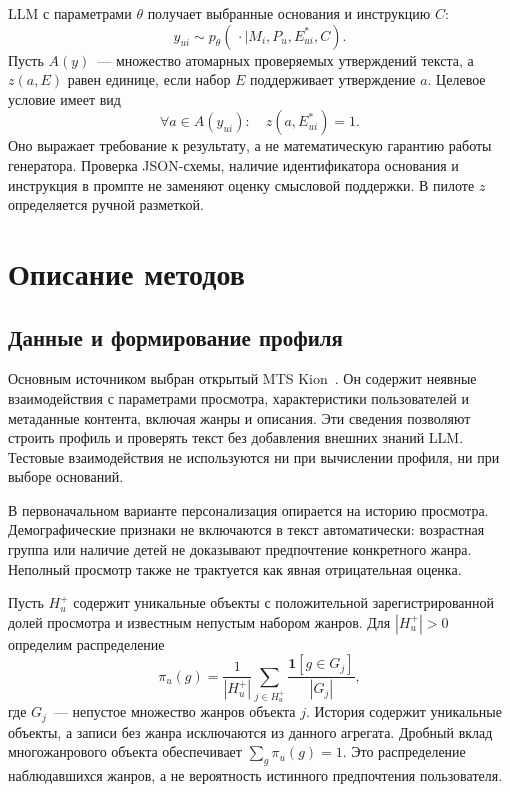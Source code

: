 \documentclass{misisarticle}
\begin{document}
LLM с параметрами $\theta$ получает выбранные основания и инструкцию $C$:
\begin{equation}
 y_{ui}\sim p_\theta(\,\cdot\mid M_i,P_u,E^*_{ui},C).
 \label{eq:generator}
\end{equation}
Пусть $A(y)$~--- множество атомарных проверяемых утверждений текста, а $z(a,E)$ равен единице, если набор $E$ поддерживает утверждение $a$. Целевое условие имеет вид
\begin{equation}
 \forall a\in A(y_{ui}):\quad z(a,E^*_{ui})=1.
 \label{eq:grounding}
\end{equation}
Оно выражает требование к результату, а не математическую гарантию работы генератора. Проверка JSON-схемы, наличие идентификатора основания и инструкция в промпте не заменяют оценку смысловой поддержки. В пилоте $z$ определяется ручной разметкой.

\section{Описание методов}

\subsection{Данные и формирование профиля}

Основным источником выбран открытый MTS Kion~\cite{kion}. Он содержит неявные взаимодействия с параметрами просмотра, характеристики пользователей и метаданные контента, включая жанры и описания. Эти сведения позволяют строить профиль и проверять текст без добавления внешних знаний LLM. Тестовые взаимодействия не используются ни при вычислении профиля, ни при выборе оснований.

В первоначальном варианте персонализация опирается на историю просмотра. Демографические признаки не включаются в текст автоматически: возрастная группа или наличие детей не доказывают предпочтение конкретного жанра. Неполный просмотр также не трактуется как явная отрицательная оценка.

Пусть $H^+_u$ содержит уникальные объекты с положительной зарегистрированной долей просмотра и известным непустым набором жанров. Для $|H^+_u|>0$ определим распределение
\begin{equation}
 \pi_u(g)=\frac{1}{|H^+_u|}
 \sum_{j\in H^+_u}\frac{\mathbf{1}[g\in G_j]}{|G_j|},
 \label{eq:profile}
\end{equation}
где $G_j$~--- непустое множество жанров объекта $j$. История содержит уникальные объекты, а записи без жанра исключаются из данного агрегата. Дробный вклад многожанрового объекта обеспечивает $\sum_g\pi_u(g)=1$. Это распределение наблюдавшихся жанров, а не вероятность истинного предпочтения пользователя.
\end{document}

